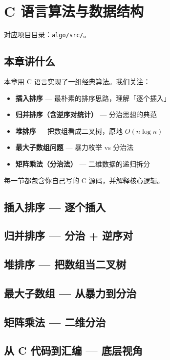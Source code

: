 \chapter{C 语言算法与数据结构}

对应项目目录：\texttt{algo/src/}。

\section{本章讲什么}

本章用 C 语言实现了一组经典算法。我们关注：

\begin{itemize}
    \item \textbf{插入排序} — 最朴素的排序思路，理解「逐个插入」
    \item \textbf{归并排序（含逆序对统计）} — 分治思想的典范
    \item \textbf{堆排序} — 把数组看成二叉树，原地 \(O(n \log n)\)
    \item \textbf{最大子数组问题} — 暴力枚举 vs 分治法
    \item \textbf{矩阵乘法（分治法）} — 二维数据的递归拆分
\end{itemize}

每一节都包含你自己写的 C 源码，并解释核心逻辑。

\section{插入排序 — 逐个插入}



\section{归并排序 — 分治 + 逆序对}



\section{堆排序 — 把数组当二叉树}



\section{最大子数组 — 从暴力到分治}



\section{矩阵乘法 — 二维分治}



\section{从 C 代码到汇编 — 底层视角}


